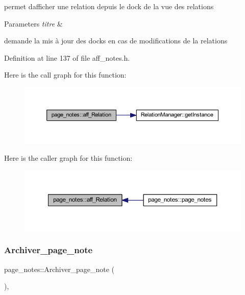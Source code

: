 permet d\textquotesingle{}afficher une relation depuis le dock de la vue des relations 


\begin{DoxyParams}{Parameters}
{\em titre} & \\
\hline
\end{DoxyParams}
demande la mis à jour des docks en cas de modifications de la relations 

Definition at line 137 of file aff\+\_\+notes.\+h.

Here is the call graph for this function\+:\nopagebreak
\begin{figure}[H]
\begin{center}
\leavevmode
\includegraphics[width=350pt]{classpage__notes_a5c00719607b3e0f3a78c3b35b6df4df9_cgraph}
\end{center}
\end{figure}
Here is the caller graph for this function\+:\nopagebreak
\begin{figure}[H]
\begin{center}
\leavevmode
\includegraphics[width=350pt]{classpage__notes_a5c00719607b3e0f3a78c3b35b6df4df9_icgraph}
\end{center}
\end{figure}
\mbox{\label{classpage__notes_a8d23f8f379d4aa402193f589ac3e4afa}} 
\subsubsection{\texorpdfstring{Archiver\+\_\+page\+\_\+note}{Archiver\_page\_note}}
{\footnotesize\ttfamily page\+\_\+notes\+::\+Archiver\+\_\+page\+\_\+note (\begin{DoxyParamCaption}{ }\end{DoxyParamCaption})\hspace{0.3cm}{\ttfamily [inline]}, {\ttfamily [slot]}}



